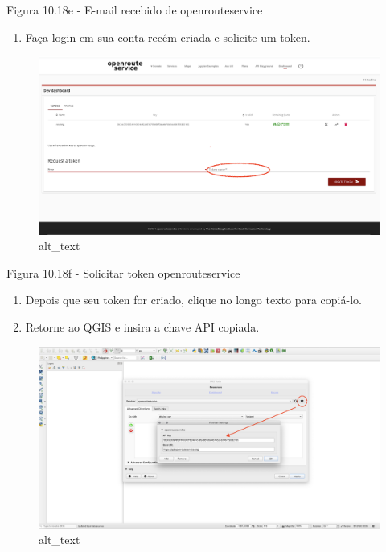 \documentclass[
]{book}
\providecommand{\tightlist}{%
  \setlength{\itemsep}{0pt}\setlength{\parskip}{0pt}}
\begin{document}
Figura 10.18e - E-mail recebido de openrouteservice

\begin{enumerate}
\def\labelenumi{\arabic{enumi}.}
\setcounter{enumi}{3}
\tightlist
\item
  Faça login em sua conta recém-criada e solicite um token.
\end{enumerate}

\begin{figure}
\centering
\includegraphics{media/modulo10/fig1018_f.png}
\caption{alt\_text}
\end{figure}

Figura 10.18f - Solicitar token openrouteservice

\begin{enumerate}
\def\labelenumi{\arabic{enumi}.}
\setcounter{enumi}{4}
\tightlist
\item
  Depois que seu token for criado, clique no longo texto para copiá-lo.
\item
  Retorne ao QGIS e insira a chave API copiada.
\end{enumerate}

\begin{figure}
\centering
\includegraphics{media/modulo10/fig1018_g.png}
\caption{alt\_text}
\end{figure}
\end{document}
